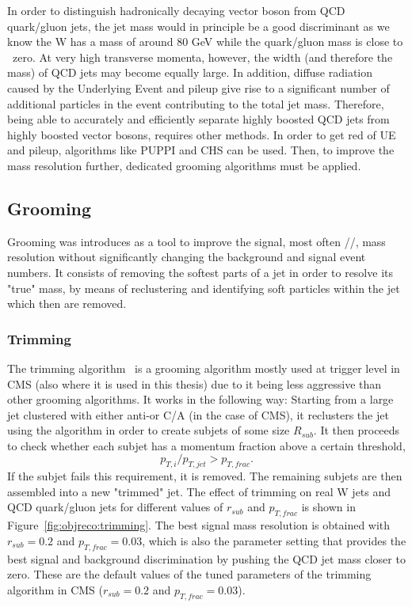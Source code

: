 In order to distinguish hadronically decaying vector boson from QCD quark/gluon jets, the jet mass would in principle be a good discriminant as we know the W has a mass of around 80 GeV while the quark/gluon mass is close to ~zero. At very high transverse momenta, however, the width (and therefore the mass) of QCD jets may become equally large. In addition, diffuse radiation caused by the Underlying Event and pileup give rise to a significant number of additional particles in the event contributing to the total jet mass.
Therefore, being able to accurately and efficiently separate highly boosted QCD jets from highly boosted vector bosons, requires other methods.
In order to get red of UE and pileup, algorithms like PUPPI and CHS can be used. Then, to improve the mass resolution further, dedicated grooming algorithms must be applied.

\subsection{Grooming}
Grooming was introduces as a tool to improve the signal, most often \PW/\PZ/, mass resolution without significantly changing the background and signal event numbers. It consists of removing the softest parts of a jet in order to resolve its "true" mass, by means of reclustering and identifying soft particles within the jet which then are removed.

\subsubsection{Trimming}
The trimming algorithm~\cite{Krohn:2009th} is a grooming algorithm mostly used at trigger level in CMS (also where it is used in this thesis) due to it being less aggressive than other grooming algorithms. It works in the following way: Starting from a large jet clustered with either anti-\kt or C/A (in the case of CMS), it reclusters the jet using the \kt algorithm in order to create subjets of some size $R_{sub}$.  It then proceeds to check whether each subjet has a momentum fraction above a certain threshold,
\begin{equation*}
p_{T,i}/p_{T,jet}>p_{T,frac}.
\end{equation*}
If the subjet fails this requirement, it is removed. The remaining subjets are then assembled into a new "trimmed" jet.
The effect of trimming on real W jets and QCD quark/gluon jets for different values of $r_{sub}$ and $p_{T,frac}$ is shown in Figure~\ref{fig:objreco:trimming}. 
The best signal mass resolution is obtained with $r_{sub}=0.2$ and $p_{T,frac}=0.03$, which is also the parameter setting that provides the best signal and background 
discrimination by pushing the QCD jet mass closer to zero. These are the default values of the tuned parameters of the trimming algorithm in CMS ($r_{sub}=0.2$ and $p_{T,frac}=0.03$).

